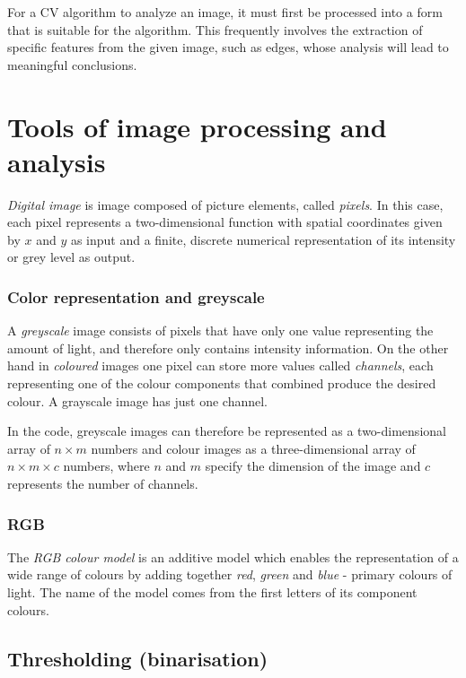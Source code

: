 For a CV algorithm to analyze an image, it must first be processed into a form that is suitable for the algorithm. This frequently involves the extraction of specific features from the given image, such as edges, whose analysis will lead to meaningful conclusions.

\section{Tools of image processing and analysis}

\emph{Digital image} is image composed of picture elements, called \emph{pixels}. In this case, each pixel represents a two-dimensional function with spatial coordinates given by $x$ and $y$ as input and a finite, discrete numerical representation of its intensity or grey level as output. \cite{digital_image_processing}

\subsubsection{Color representation and greyscale}

A \emph{greyscale} image consists of pixels that have only one value representing the amount of light, and therefore only contains intensity information. \cite{digital_photography} On the other hand in \emph{coloured} images one pixel can store more values called \emph{channels}, each representing one of the colour components that combined produce the desired colour. A grayscale image has just one channel.

In the code, greyscale images can therefore be represented as a two-dimensional array of $n \times m$ numbers and colour images as a three-dimensional array of $n \times m \times c$ numbers, where $n$ and $m$ specify the dimension of the image and $c$ represents the number of channels.

\subsubsection{RGB}

The \emph{RGB colour model} is an additive model which enables the representation of a wide range of colours by adding together \emph{red}, \emph{green} and \emph{blue} - primary colours of light. The name of the model comes from the first letters of its component colours. \cite{colour_photography}

\subsection{Thresholding (binarisation)}

